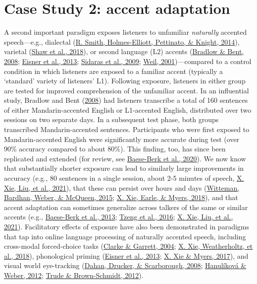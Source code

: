 \documentclass[
  11pt,
  man,floatsintext]{apa6}
\begin{document}
\hypertarget{case-study-2-accent-adaptation}{%
\section{Case Study 2: accent adaptation}\label{case-study-2-accent-adaptation}}

A second important paradigm exposes listeners to unfamiliar \emph{naturally} accented speech---e.g., dialectal (\protect\hyperlink{ref-smith2014}{R. Smith, Holmes-Elliott, Pettinato, \& Knight, 2014}), varietal (\protect\hyperlink{ref-shaw2018}{Shaw et al., 2018}), or second language (L2) accents (\protect\hyperlink{ref-bradlow-bent2008}{Bradlow \& Bent, 2008}; \protect\hyperlink{ref-eisner2013}{Eisner et al., 2013}; \protect\hyperlink{ref-sidaras2009}{Sidaras et al., 2009}; \protect\hyperlink{ref-weil2001a}{Weil, 2001})---compared to a control condition in which listeners are exposed to a familiar accent (typically a `standard' variety of listeners' L1). Following exposure, listeners in either group are tested for improved comprehension of the unfamiliar accent. In an influential study, Bradlow and Bent (\protect\hyperlink{ref-bradlow-bent2008}{2008}) had listeners transcribe a total of 160 sentences of either Mandarin-accented English or L1-accented English, distributed over two sessions on two separate days. In a subsequent test phase, both groups transcribed Mandarin-accented sentences. Participants who were first exposed to Mandarin-accented English were significantly more accurate during test (over 90\% accuracy compared to about 80\%). This finding, too, has since been replicated and extended (for review, see \protect\hyperlink{ref-baeseberk2020}{Baese-Berk et al., 2020}). We now know that substantially shorter exposure can lead to similarly large improvements in accuracy (e.g., 80 sentences in a single session, about 2-5 minutes of speech, \protect\hyperlink{ref-xie2021jep}{X. Xie, Liu, et al., 2021}), that these can persist over hours and days (\protect\hyperlink{ref-witteman2015}{Witteman, Bardhan, Weber, \& McQueen, 2015}; \protect\hyperlink{ref-xie2018lcn}{X. Xie, Earle, \& Myers, 2018}), and that accent adaptation can sometimes generalize across talkers of the same or similar accents (e.g., \protect\hyperlink{ref-baeseberk2013}{Baese-Berk et al., 2013}; \protect\hyperlink{ref-tzeng2016}{Tzeng et al., 2016}; \protect\hyperlink{ref-xie2021jep}{X. Xie, Liu, et al., 2021}). Facilitatory effects of exposure have also been demonstrated in paradigms that tap into online language processing of naturally accented speech, including cross-modal forced-choice tasks (\protect\hyperlink{ref-clarke-garrett2004}{Clarke \& Garrett, 2004}; \protect\hyperlink{ref-xie2018jasa}{X. Xie, Weatherholtz, et al., 2018}), phonological priming (\protect\hyperlink{ref-eisner2013}{Eisner et al., 2013}; \protect\hyperlink{ref-xie2017}{X. Xie \& Myers, 2017}), and visual world eye-tracking (\protect\hyperlink{ref-dahan2008}{Dahan, Drucker, \& Scarborough, 2008}; \protect\hyperlink{ref-hanulikova-weber2012}{Hanulíková \& Weber, 2012}; \protect\hyperlink{ref-trude2012talker}{Trude \& Brown-Schmidt, 2012}).
\end{document}
